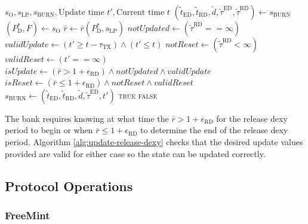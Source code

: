 \documentclass{ifcolog}
\newcommand{\Pdt}{P_{\mathrm{D}}^{*}}
\newcommand{\rr}{\bar{r}}
\newcommand{\slp}{s_{\mathrm{LP}}}
\newcommand{\soracle}{s_{\textrm{O}}}
\newcommand{\sburn}{s_{\textrm{BURN}}}
\newcommand{\tautx}{\tau_{\textrm{TX}}}
\newcommand{\epsilonreleasedexy}{\epsilon_{\textrm{RD}}}
\begin{document}
\begin{algorithm}[H]
\caption{UpdateReleaseDexy}\label{alg:update-release-dexy}
\begin{algorithmic}[1]
\Require $\soracle, \slp, \sburn, \textrm{Update time } t', \textrm{Current time } t$
\State $(\tilde{t}_{\textrm{ED}}, \tilde{t}_{\textrm{RD}}, \tilde{d}, \tilde{\tau}^{\textrm{ED}}, \tilde{\tau}^{\textrm{RD}}) \gets \sburn$
\State $(\Pdt, F) \gets \soracle$ 
\State $\rr \gets \rr(\Pdt, \slp)$
\State $notUpdated \gets (\tilde{\tau}^{\textrm{RD}} == \infty)$
\State $validUpdate \gets (t' \ge t - \tautx) \land (t' \le t)$ 
\State $notReset \gets (\tilde{\tau}^{\textrm{RD}} < \infty)$
\State $validReset \gets (t' == \infty)$
\State $isUpdate \gets (\rr > 1  + \epsilonreleasedexy) \land notUpdated \land validUpdate$ 
\State $isReset \gets (\rr \le 1 + \epsilonreleasedexy) \land notReset \land validReset$
  \State $\sburn \gets (\tilde{t}_{\textrm{ED}}, \tilde{t}_{\textrm{RD}}, \tilde{d}, \tilde{\tau}^{\textrm{ED}}, t')$
  \State \Return \textsc{true}
\Else
  \State \Return \textsc{false}
\EndIf
\end{algorithmic}
\end{algorithm}

The bank requires knowing at what time the $\rr > 1  + \epsilonreleasedexy$ for the release dexy period to begin 
or when $\rr \le 1 + \epsilonreleasedexy$ to determine the end of the release dexy period. 
Algorithm \ref{alg:update-release-dexy} checks that the desired update values provided are valid for either case so the state 
can be updated correctly.

\newpage

\subsection{Protocol Operations}

\subsubsection{FreeMint}
\end{document}
